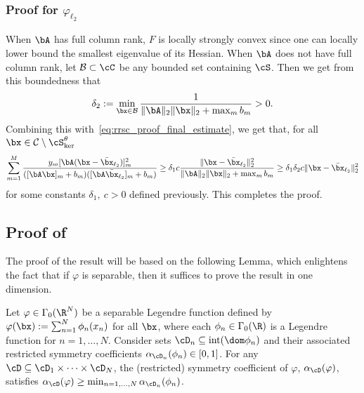 \documentclass[11pt]{amsart}
\begin{document}
\subsubsection{Proof for $\varphi_{\ell_2}$}
When $\bA$ has full column rank, $F$ is locally strongly convex since one can locally lower bound the smallest eigenvalue of its Hessian. When $\bA$ does not have full column rank, let $\mathcal{B} \subset \cC$ be any bounded set containing $\cS$. Then we get from this boundedness that
$$
\delta_2 := \min_{\bx \in \mathcal{B}} \frac{1}{\|\bA\|_2 \|\bx\|_2 + \max_m b_m} >0.
$$
Combining this with~\eqref{eq:rrsc_proof_final_estimate}, we get that, for all $\bx \in \mathcal{C} \setminus \cS^{\theta}_{\ker}$
$$
\sum_{m =1}^{M} \frac{y_{m}[\bA(\bx-\bar\bx_{\ell_2})]_m^2}{([\bA\bx]_m+b_m)([ \bA\bar\bx_{\ell_2}]_m+b_m)}\geq
\delta_1c\frac{\|\bx-\bar\bx_{\ell_2}\|_2^2}{\|\bA\|_2\|\bx\|_2+\max_m b_m} \geq \delta_1 \delta_2 c \|\bx-\bar\bx_{\ell_2}\|_2^2
$$
for some constants $\delta_1, \ c>0$ defined previously. This completes the proof.

\subsection{Proof of~}\label{sec:alphaKL_is_positive}

The proof of the result will be based on the following Lemma, which enlightens the fact that if $\varphi$ is separable, then it suffices to prove the result in one dimension.

\begin{lemma}\label{lem:from_n_to_one}
Let $\varphi\in\Gamma_0(\R^N)$ be a separable Legendre function defined by $\varphi(\bx):=\sum_{n=1}^N\phi_n(x_n)$ for all $\bx$, where each $\phi_n\in\Gamma_0(\R)$ is a Legendre function for $n=1,\ldots, N$. Consider sets $\cD_n\subseteq \mathrm{int}(\dom \phi_n)$ and their associated restricted symmetry coefficients $\alpha_{\cD_n}(\phi_n)\in[0,1]$. For any $\cD\subseteq \cD_1\times\cdots\times\cD_N$, the (restricted) symmetry coefficient of $\varphi$, $\alpha_\cD(\varphi)$, satisfies $\alpha_{\cD}(\varphi) \geq \min_{n=1,...,N} \alpha_{\cD_n}(\phi_n)$.
\end{lemma}
\end{document}
